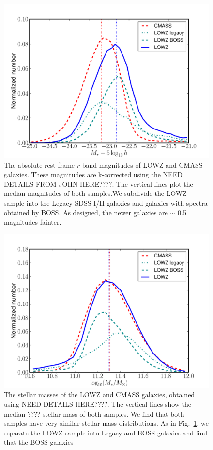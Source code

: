 \documentclass[preprint]{aastex}
\begin{document}
\begin{figure}
\includegraphics[width=0.95\columnwidth]{plots/LOWZ-r_absmag}
\caption{The absolute rest-frame $r$ band magnitudes of LOWZ and CMASS
galaxies. These magnitudes are k-corrected using the NEED DETAILS FROM JOHN
HERE????. The vertical lines plot the median magnitudes of both samples.We
subdivide the LOWZ sample into the Legacy SDSS-I/II galaxies and galaxies with spectra 
obtained by BOSS. As designed, the newer galaxies are
$\sim$ 0.5 magnitudes fainter.}
\label{fig:absmag}
\end{figure}

\begin{figure}
\includegraphics[width=0.95\columnwidth]{plots/LOWZ-stellarmass}
\caption{The stellar masses of the LOWZ and CMASS galaxies, obtained using NEED
DETAILS HERE????. The vertical lines show the median ???? stellar mass of both
samples. We find that both samples have very similar stellar mass distributions.
As in Fig.~\ref{fig:absmag}, we separate the LOWZ sample into Legacy and BOSS
galaxies and find that the BOSS galaxies }
\label{fig:stellarmass}
\end{figure}
\end{document}
